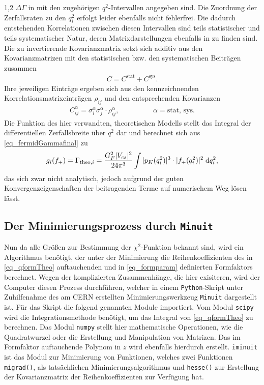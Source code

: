 \documentclass[11pt,a4paper,twoside]{report}
\begin{document}
\begin{spacing}{1,2}
 $\Delta \Gamma$ in \cite{PhysRev_Data} mit den zugehörigen $q^2$-Intervallen angegeben sind. Die 
Zuordnung der Zerfallsraten zu den $q^2_i$ erfolgt leider ebenfalls nicht fehlerfrei. Die dadurch entstehenden Korrelationen zwischen diesen Intervallen 
sind teils statistischer und teils systematischer Natur, deren Matrixdarstellungen ebenfalls in \cite{PhysRev_Data} zu finden 
sind. Die zu invertierende Kovarianzmatrix setzt sich additiv aus den Kovarianzmatrizen mit den statistischen bzw. den systematischen Beiträgen zusammen
\begin{align}
 C = C^{\text{stat}} + C^{\text{sys}}.
\end{align}
Ihre jeweiligen Einträge ergeben sich aus den kennzeichnenden Korrelationsmatrixeinträgen $\rho_{ij}$ und den entsprechenden Kovarianzen
\begin{align}
 C^{\alpha}_{ij} = \sigma^{\alpha}_i \sigma^{\alpha}_j \cdot \rho^{\alpha}_{ij}, \hspace{2cm}\alpha = \text{stat, sys}.
\end{align}
Die Funktion des hier verwandten, theoretischen Modells stellt das Integral der differentiellen Zerfallsbreite über $q^2$ dar und berechnet sich aus 
\eqref{eq_fermidGammafinal} zu
\begin{align}
 g_i(f_+) = \Gamma_{\text{theo},i} = \frac{G_F^2 |V_{cs}|^2}{24\pi^3}\int|p_K(q_i^2)|^3 \cdot |f_+(q^2_i)|^2\; \mathrm{d} q_i^2,
 \label{eq_qformTheo}
\end{align}
das sich zwar nicht analytisch, jedoch aufgrund der guten Konvergenzeigenschaften der beitragenden Terme auf numerischem Weg lösen lässt. 

\subsection{Der Minimierungsprozess durch \texttt{Minuit}}
Nun da alle Größen zur Bestimmung der $\chi^2$-Funktion bekannt sind, wird ein Algorithmus benötigt, der unter der Minimierung die Reihenkoeffizienten
des in \eqref{eq_qformTheo} auftauchenden und in \eqref{eq_formparam} definierten Formfaktors berechnet. Wegen der komplizierten Zusammenhänge, die hier
exisiteren, wird der Computer diesen Prozess durchführen, welcher in einem \texttt{Python}-Skript unter Zuhilfenahme des am CERN erstellten 
Minimierungswerkzeug \texttt{Minuit} dargestellt ist. Für das Skript die folgend genannten Module importiert.
Vom Modul \texttt{scipy} wird die Integrationsmethode benötigt, um das Integral von \eqref{eq_qformTheo} zu berechnen. Das Modul \texttt{numpy} stellt hier
mathematische Operationen, wie die Quadratwurzel oder die Erstellung und Manipulation von Matrizen. Das im Formfaktor auftauchende Polynom in $z$ wird
ebenfalls hierdurch erstellt. \texttt{iminuit} ist das Modul zur Minimierung von Funktionen, welches zwei Funktionen \texttt{migrad()}, als tatsächlichen
Minimierungsalgorithmus und \texttt{hesse()} zur Erstellung der Kovarianzmatrix der Reihenkoeffizienten zur Verfügung hat. 


\end{spacing}
\end{document}
